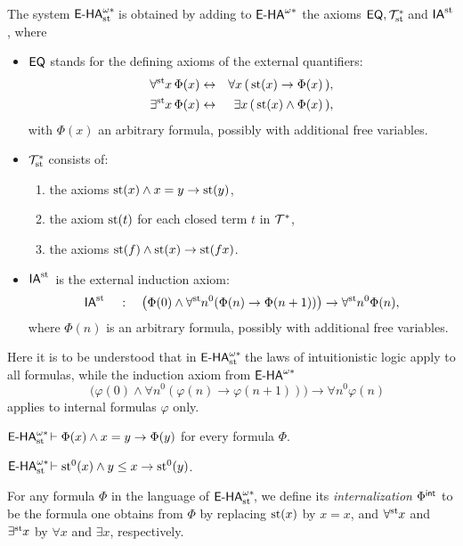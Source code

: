 \begin{dfn} The system ${\textsf{\upshape E-HA}}^{\omega*}_{\operatorname{st}{}}\!$ is obtained by adding to ${\textsf{\upshape E-HA}}^{\omega*}$ the axioms $\textsf{\upshape EQ}, \mathcal{T}^*_{\operatorname{st}{}}\!$ and  $\textsf{\upshape IA}^{\operatorname{st}{}}$, where
\begin{itemize}
\item $\textsf{\upshape EQ}$ stands for the defining axioms of the external quantifiers:
\begin{eqnarray*}
\forall^{\operatorname{st}{}}\! x \, \Phi(x) & \leftrightarrow &  \forall x \, (\, \operatorname{st}(x)\rightarrow\Phi(x) \, ),\\
\exists^{\operatorname{st}{}}\! x \, \Phi(x) & \leftrightarrow & \exists x \, (\, \operatorname{st}(x)\wedge\Phi(x) \, ),
\end{eqnarray*}
with $\Phi(x)$ an arbitrary formula, possibly with additional free variables.
\item $\mathcal{T}^*_{\operatorname{st}{}}\!$ consists of:
\begin{enumerate}
\item the axioms $\operatorname{st}(x) \land x = y \to \operatorname{st}(y)$,
\item the axiom $\operatorname{st}(t)$ for each closed term $t$ in $\mathcal{T}^*$,
\item the axioms $\operatorname{st}(f)\wedge\operatorname{st}(x)\rightarrow\operatorname{st}(fx)$.
\end{enumerate}
\item $ \textsf{\upshape IA}^{\operatorname{st}{}}$ is the external induction axiom:
\[
\textsf{\upshape IA}^{\operatorname{st}{}} \quad : \quad\big(\Phi(0)\wedge\forall^{\operatorname{st}{}}\! n^0 (\Phi(n)\rightarrow\Phi(n+1) )\big)\rightarrow\forall^{\operatorname{st}{}}\! n^0 \Phi(n),
\]
where $\Phi(n)$ is an arbitrary formula, possibly with additional free variables.
\end{itemize}
Here it is to be understood that in ${\textsf{\upshape E-HA}}^{\omega*}_{\operatorname{st}{}}\!$ the laws of intuitionistic logic apply to all formulas, while the induction axiom from ${\textsf{\upshape E-HA}}^{\omega*}$
\[ \quad\big(\varphi(0)\wedge\forall n^0 (\varphi(n)\rightarrow\varphi(n+1) )\big)\rightarrow\forall n^0 \varphi(n) \]
applies to internal formulas $\varphi$ only.
\end{dfn}

\begin{lemma} \label{congruence}
${\textsf{\upshape E-HA}}^{\omega*}_{\operatorname{st}{}}\! \vdash \Phi(x) \land x= y\to \Phi(y)$ for every formula $\Phi$.
\label{le:extensionality}
\end{lemma}

\begin{lemma}
${\textsf{\upshape E-HA}}^{\omega*}_{\operatorname{st}{}}\! \vdash \operatorname{st}^0(x) \land y \leq x \to \operatorname{st}^0(y)$.
\end{lemma}

\begin{dfn}
For any formula $\Phi$ in the language of ${\textsf{\upshape E-HA}}^{\omega*}_{\operatorname{st}{}}\!$, we define its \emph{internalization} $\Phi^{{\textsf{\upshape int}}}$ to be the formula one obtains from $\Phi$ by replacing $\operatorname{st}(x)$ by $x = x$, and $\forall^{\operatorname{st}{}}\! x$ and $\exists^{\operatorname{st}{}}\! x$ by $\forall x$ and $\exists x$, respectively.
\end{dfn}

